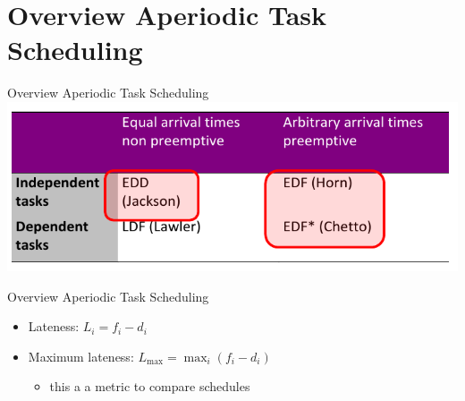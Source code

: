 \section{Overview Aperiodic Task Scheduling}

\begin{frame}{Overview Aperiodic Task Scheduling}
  \centering
  \includegraphics[width=\textwidth]{./figures/overview_aperiodic_task_scheduling.png}
\end{frame}

\begin{frame}{Overview Aperiodic Task Scheduling}
  \begin{itemize}
    \item \alert{Lateness:} $L_i = f_i - d_i$
    \item \alert{Maximum lateness:} $\displaystyle L_{\max }=\max_i\left(f_i-d_i\right)$
    \begin{itemize}
      \item this a a metric to compare schedules
    \end{itemize}
  \end{itemize}
\end{frame}

